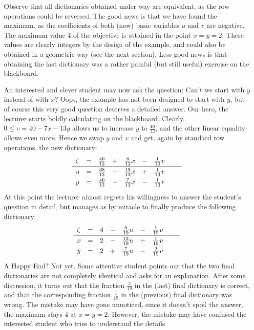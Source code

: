 \documentclass[ukenglish]{nik}
\begin{document}
Observe that all dictionaries obtained under way are equivalent,
as the row operations could be reversed. 
The good news is that we have found the maximum, as the coefficients of
both (now) basic variables $u$ and $v$ are negative. The maximum value $4$
of the objective is attained in the point $x=y=2$. These values are clearly
integers by the design of the example, and could also be obtained in a geometric
way (see the next section). Less good news is that obtaining the last dictionary
was a rather painful (but still useful) exercise on the blackboard.

An interested and clever student may now ask the question: 
Can't we start with $y$ instead of with $x$?
Oops, the example has not been designed to start with $y$, 
but of course this very good question deserves a detailed answer.
Our hero, the lecturer starts boldly calculating on the blackboard.
Clearly, $0\leq v = 40 - 7x -13y$ allows us to increase $y$ to $\frac{40}{13}$,
and the other linear equality allows even more. Hence we swap $y$ and $v$ and get,
again by standard row operations, the new dictionary:
\[    
    \begin{array}{lcrcrcrcr}
      \zeta&=& \frac{40}{13} &+& \frac{6}{13} x &-& \frac{1}{13} v &\vphantom{\frac{|}{|}} &  \\\hline
      u    &=& \frac{38}{13} &-&\frac{19}{13} x &+& \frac{1}{13} v &\vphantom{\frac{|}{|}} &  \\
      y    &=& \frac{40}{13} &-& \frac{7}{13} x &-& \frac{1}{13} v &\vphantom{\frac{|}{|}} &  \\
    \end{array}
\]
At this point the lecturer almost regrets his willingness to answer the student's
question in detail, but manages as by miracle to finally produce the following dictionary
\[    
    \begin{array}{lcrcrcrcr}
      \zeta&=& 4 &-& \frac{6}{19} u &-& \frac{1}{19} v &\vphantom{\frac{|}{|}} &  \\\hline
      x    &=& 2 &-&\frac{13}{19} u &+& \frac{1}{19} v &\vphantom{\frac{|}{|}} &  \\
      y    &=& 2 &+& \frac{7}{19} u &-& \frac{2}{19} v &\vphantom{\frac{|}{|}} &  \\
    \end{array}
\]
A Happy End? Not yet. Some attentive student points out that the two final dictionaries
are not completely identical and asks for an explanation. After some discussion, it turns
out that the fraction $\frac{2}{19}$ in the (last) final dictionary is correct,
and that the corresponding fraction $\frac{1}{19}$ in the (previous) final dictionary was wrong.
The mistake may have gone unnoticed, since it doesn't spoil the answer, the maximum stays
$4$ at $x=y=2$. However, the mistake may have confused the interested student who tries
to understand the details.
\end{document}

